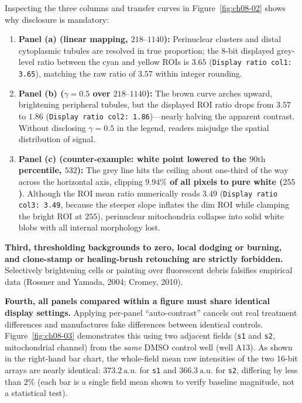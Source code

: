 Inspecting the three columns and transfer curves in Figure~\ref{fig:ch08-02} shows why disclosure is mandatory:
\begin{enumerate}
\item \textbf{Panel (a) (linear mapping, $218\text{--}1140$):} Perinuclear clusters and distal cytoplasmic tubules are resolved in true proportion; the 8-bit displayed grey-level ratio between the cyan and yellow ROIs is $3.65$ (\texttt{Display ratio col1: 3.65}), matching the raw ratio of $3.57$ within integer rounding.
\item \textbf{Panel (b) ($\gamma = 0.5$ over $218\text{--}1140$):} The brown curve arches upward, brightening peripheral tubules, but the displayed ROI ratio drops from $3.57$ to $1.86$ (\texttt{Display ratio col2: 1.86})---nearly halving the apparent contrast. Without disclosing $\gamma = 0.5$ in the legend, readers misjudge the spatial distribution of signal.
\item \textbf{Panel (c) (counter-example: white point lowered to the $90\text{th}$ percentile, $532$):} The grey line hits the ceiling about one-third of the way across the horizontal axis, clipping \textbf{$9.94\%$ of all pixels to pure white ($255$)}. Although the ROI mean ratio numerically reads $3.49$ (\texttt{Display ratio col3: 3.49}, because the steeper slope inflates the dim ROI while clamping the bright ROI at $255$), perinuclear mitochondria collapse into solid white blobs with all internal morphology lost.
\end{enumerate}

\textbf{Third, thresholding backgrounds to zero, local dodging or burning, and clone-stamp or healing-brush retouching are strictly forbidden.} Selectively brightening cells or painting over fluorescent debris falsifies empirical data (Rossner and Yamada, 2004; Cromey, 2010).

\textbf{Fourth, all panels compared within a figure must share identical display settings.} Applying per-panel ``auto-contrast'' cancels out real treatment differences and manufactures fake differences between identical controls. Figure~\ref{fig:ch08-03} demonstrates this using two adjacent fields (\texttt{s1} and \texttt{s2}, mitochondrial channel) from the \emph{same} DMSO control well (well A13). As shown in the right-hand bar chart, the whole-field mean raw intensities of the two 16-bit arrays are nearly identical: $373.2\ \text{a.u.}$ for \texttt{s1} and $366.3\ \text{a.u.}$ for \texttt{s2}, differing by less than $2\%$ (each bar is a single field mean shown to verify baseline magnitude, not a statistical test).

